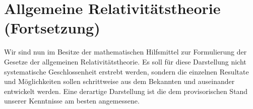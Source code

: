 %
%

\section{Allgemeine Relativitätstheorie (Fortsetzung)}
\label{sec:all-2}

Wir sind nun im Besitze der mathematischen Hilfsmittel zur Formulierung der Gesetze der allgemeinen
Relativitätstheorie. Es soll für diese Darstellung nicht
systematische Geschlossenheit erstrebt werden, sondern
die einzelnen Resultate und Möglichkeiten sollen schrittweise aus dem Bekannten und auseinander entwickelt
werden. Eine derartige Darstellung ist die dem provisorischen Stand unserer Kenntnisse am besten angemessene.